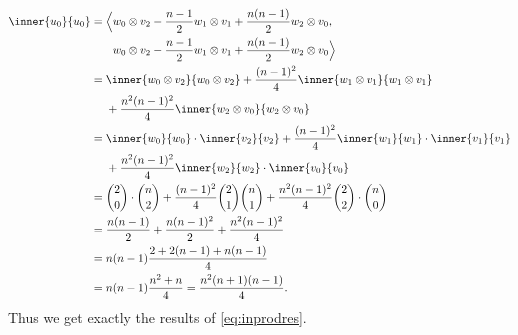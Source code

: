 \begin{align*}
  \inner{u_0}{u_0} &= \Bigl\langle w_0\otimes v_2 - \dfrac{n-1}{2}w_1\otimes v_1 + \dfrac{n(n-1)}{2}w_2\otimes v_0, \\*
                   &\phantom{{}={}\Bigl\langle }{} w_0\otimes v_2 - \dfrac{n-1}{2}w_1\otimes v_1 + \dfrac{n(n-1)}{2}w_2\otimes v_0 \Bigr\rangle \\
                   &= \inner{w_0\otimes v_2}{w_0\otimes v_2} + \dfrac{(n-1)^2}{4}\inner{w_1\otimes v_1}{w_1\otimes v_1} \\*
                   &\phantom{{}={}}{} + \dfrac{n^2(n-1)^2}{4}\inner{w_2\otimes v_0}{w_2\otimes v_0} \\
                   &= \inner{w_0}{w_0}\cdot\inner{v_2}{v_2} + \dfrac{(n-1)^2}{4}\inner{w_1}{w_1}\cdot\inner{v_1}{v_1} \\*
                   &\phantom{{}={}}{} + \dfrac{n^2(n-1)^2}{4}\inner{w_2}{w_2}\cdot\inner{v_0}{v_0} \\
                   &= \binom{2}{0}\cdot\binom{n}{2} + \dfrac{(n-1)^2}{4}\binom{2}{1}\binom{n}{1} + \dfrac{n^2(n-1)^2}{4}\binom{2}{2}\cdot\binom{n}{0} \\
                   &= \dfrac{n(n-1)}{2} + \dfrac{n(n-1)^2}{2} + \dfrac{n^2(n-1)^2}{4} \\
                   &= n(n-1)\dfrac{2+2(n-1)+n(n-1)}{4} \\
                   &= n(n-1)\dfrac{n^2 + n}{4} = \dfrac{n^2(n+1)(n-1)}{4}.
\end{align*}
Thus we get exactly the results of \cref{eq:inprodres}. 
